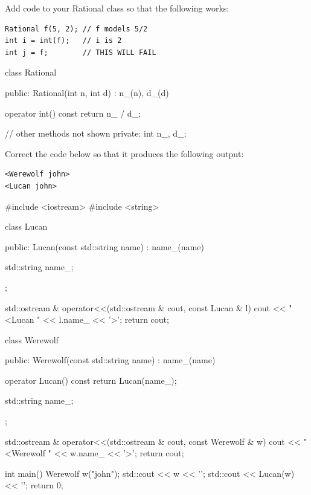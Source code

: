 

\nextq
Add code to your Rational class so that the following works:
\begin{Verbatim}[frame=single, fontsize=\footnotesize]
Rational f(5, 2); // f models 5/2
int i = int(f);   // i is 2
int j = f;        // THIS WILL FAIL
\end{Verbatim}
\ANSWER
\begin{answercode}
class Rational
{
public:
    Rational(int n, int d)
        : n_(n), d_(d)
    {}

    operator int() const
    {
      return n_ / d_;
    }

    // other methods not shown
private:
    int n_, d_;
}
\end{answercode}

\nextq
Correct the code below so that it produces the following output:
\begin{Verbatim}[frame=single,fontsize=\footnotesize]
<Werewolf john>
<Lucan john>
\end{Verbatim}
\begin{answercode}
#include <iostream>
#include <string>

class Lucan
{
public:
    Lucan(const std::string name)
        : name_(name)
    {}

    std::string name_;
};

std::ostream & operator<<(std::ostream & cout, const Lucan & l)
{
    cout << "<Lucan " << l.name_ << '>';
    return cout;
}

class Werewolf
{
public:
    Werewolf(const std::string name)
        : name_(name)
    {}

    operator Lucan() const
    {
        return Lucan(name_);
    }

    std::string name_;
};

std::ostream & operator<<(std::ostream & cout, const Werewolf & w)
{
    cout << "<Werewolf " << w.name_ << '>';
    return cout;
}

int main()
{
    Werewolf w("john");
    std::cout << w << '\n';
    std::cout << Lucan(w) << '\n';
    return 0;
}
\end{answercode}


